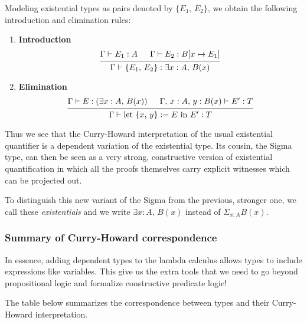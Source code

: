 \documentclass{article}
\begin{document}
Modeling existential types as pairs denoted by $\{E_1, \, E_2\}$, we obtain the
following introduction and elimination rules:

\begin{enumerate}
  \item \textbf{Introduction} \\
  \[
  \begin{prooftree}
    \hypo{\Gamma \vdash E_1 : A}
    \hypo{\Gamma \vdash E_2 : B[x \mapsto E_1]}
    \infer2{\Gamma \vdash \{E_1, \, E_2\} : \exists x : A, \, B(x)}
  \end{prooftree}
  \]
 
  \item \textbf{Elimination} \\
  \[
    \begin{prooftree}
      \hypo{\Gamma \vdash E : (\exists x : A, \, B(x)) }
      \hypo{\Gamma, \, x : A, \, y : B(x) \vdash E' : T}
      \infer2{\Gamma \vdash \text{let } \{x, \, y\} := E \text{ in } E' : T}
    \end{prooftree}
  \]
  \end{enumerate}

Thus we see that the Curry-Howard interpretation of the usual existential
quantifier is a dependent variation of the existential type. 
Its cousin, the Sigma type, can then
be seen as a very strong, constructive version of existential quantification in
which all the proofs themselves carry explicit witnesses which can be projected
out.

To distinguish this new variant of the Sigma from the previous, stronger one,
we call these \textit{existentials} and we write $\exists x : A, \, B(x)$ instead of 
$\Sigma_{x : A} B(x)$.

\subsubsection{Summary of Curry-Howard correspondence}
In essence, adding dependent types to the lambda calculus allows types to include
expressions like variables.
This give us the extra tools that we need to go beyond propositional logic and
formalize constructive predicate logic!

The table below summarizes the correspondence between types and their Curry-Howard
interpretation.
\end{document}
